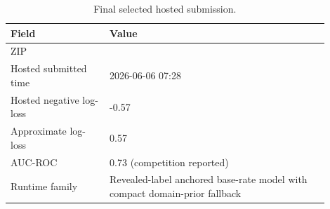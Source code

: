 \begin{table}[H]
\centering
\small
\caption{Final selected hosted submission.}
\label{tab:selected}
\setlength{\tabcolsep}{5pt}
\begin{tabular}{L{0.28\linewidth}L{0.62\linewidth}}
\toprule
Field & Value \\
\midrule
ZIP &  \\
Hosted submitted time & 2026-06-06 07:28 \\
Hosted negative log-loss & -0.57 \\
Approximate log-loss & 0.57 \\
AUC-ROC & 0.73 (competition reported) \\
Runtime family & Revealed-label anchored base-rate model with compact domain-prior fallback \\
\bottomrule
\end{tabular}
\end{table}
